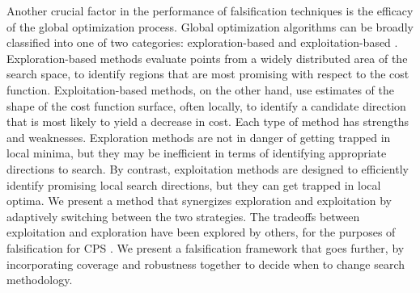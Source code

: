

Another crucial factor in the performance of falsification techniques is the efficacy of the global optimization process.
Global optimization algorithms can be broadly classified into one of two
categories: exploration-based and exploitation-based \cite{Blum03}.
Exploration-based methods evaluate points from a widely distributed area 
of the search space, to identify regions that are most promising with 
respect to the cost function. Exploitation-based methods, on the other hand, 
use estimates of the shape of the cost function surface, often locally, to
identify a candidate direction that is most likely to yield a decrease
in cost. Each type of method has strengths and weaknesses. Exploration
methods are not in danger of getting trapped in local minima, but they may 
be inefficient in terms of identifying appropriate directions to search.  By
contrast, exploitation methods are designed to efficiently identify
promising local search directions, but they can get trapped in local optima.
We present a method that synergizes exploration and 
exploitation by adaptively switching between the two strategies.
The tradeoffs between exploitation and exploration have been explored by others, 
for the purposes of falsification for CPS \cite{Ratschan14}. We present a falsification framework that goes further, by incorporating coverage and robustness together to decide when to change search methodology.


